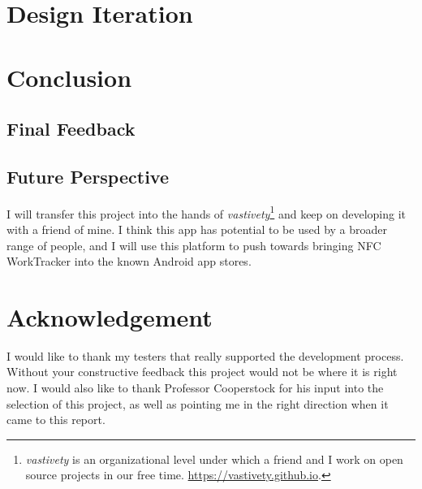 \documentclass[conference]{IEEEtran}
\newcommand{\projectname}{NFC WorkTracker}
\begin{document}
\section{Design Iteration}

\section{Conclusion}

\subsection{Final Feedback}

\subsection{Future Perspective}
I will transfer this project into the hands of \textit{vastivety}\footnote{\textit{vastivety} is an organizational level under which a friend and I work on open source projects in our free time. \url{https://vastivety.github.io}.} and keep on developing it with a friend of mine. I think this app has potential to be used by a broader range of people, and I will use this platform to push towards bringing {\projectname} into the known Android app stores.

\section*{Acknowledgement}
I would like to thank my testers that really supported the development process. Without your constructive feedback this project would not be where it is right now. I would also like to thank Professor Cooperstock for his input into the selection of this project, as well as pointing me in the right direction when it came to this report.
\end{document}
